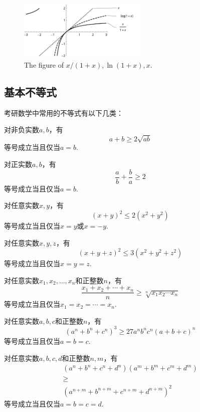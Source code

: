 \begin{figure}
  \centering
  \includegraphics[width=0.55\textwidth]{figure/x-slash-1-plus-x-ln-x-x.pdf}
  \caption{The figure of $x/(1+x), \ln{(1+x)}, x$.}
  \label{fig:x-slash-1-plus-x-ln-x-x}
\end{figure}

\subsection{基本不等式}

考研数学中常用的不等式有以下几类：

对非负实数$a,b$，有
\begin{equation}
	a+b \geq 2\sqrt {ab}
\end{equation}
等号成立当且仅当$a=b$.

对正实数$a,b$，有
\begin{equation}
	\dfrac{a}{b}+\dfrac{b}{a} \geq 2
\end{equation}
等号成立当且仅当$a=b$.

对任意实数$x,y$，有
\begin{equation}
	(x+y)^2 \leq 2(x^2+y^2)
\end{equation}
等号成立当且仅当$x=y$或$x=-y$.

对任意实数$x,y,z$，有
\begin{equation}
	(x+y+z)^2 \leq 3(x^2+y^2+z^2)
\end{equation}
等号成立当且仅当$x=y=z$.

对任意实数$x_1,x_2,\dots,x_n$和正整数$n$，有
\begin{equation}
	\dfrac{x_1+x_2+\cdots+x_n}{n} \geq \sqrt[n]{x_1x_2\cdots x_n}
\end{equation}
等号成立当且仅当$x_1=x_2=\cdots=x_n$.

对任意实数$a,b,c$和正整数$n$，有
\begin{equation}
	(a^n+b^n+c^n)^3 \geq 27a^nb^nc^n(a+b+c)^n
\end{equation}
等号成立当且仅当$a=b=c$.

对任意实数$a,b,c,d$和正整数$n,m$，有
\begin{equation}
	\begin{array}{c}
		(a^n+b^n+c^n+d^n)(a^m+b^m+c^m+d^m)\\ \geq \\(a^{n+m}+b^{n+m}+c^{n+m}+d^{n+m})^2
	\end{array}
\end{equation}
等号成立当且仅当$a=b=c=d$.

